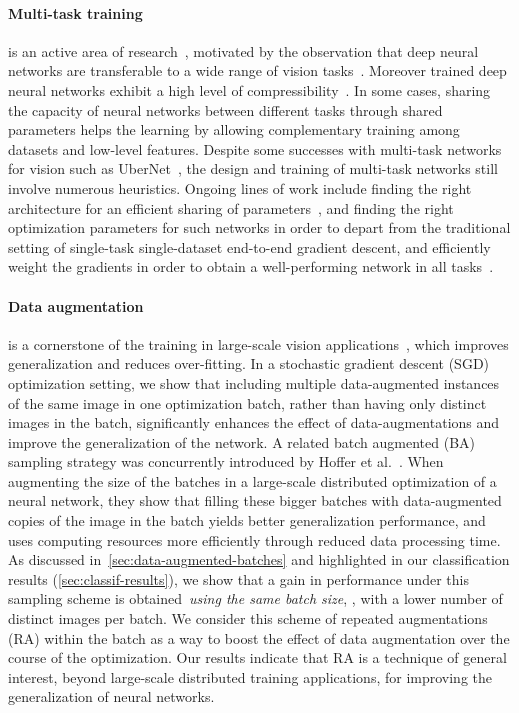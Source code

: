\paragraph{Multi-task training}\hspace{-1em}
is an active area of research~\cite{Kokkinos2017UberNetTA,Zamir2018TaskonomyDT}, motivated by the observation that deep neural networks are transferable to a wide range of vision tasks~\cite{Razavian2014CNNFO}. 
%
Moreover trained deep neural networks exhibit a high level of compressibility~\cite{han2015deep}. 
%
In some cases, sharing the capacity of neural networks between different tasks through shared parameters  
%
helps the learning by allowing complementary training among datasets and low-level features. 
Despite some successes with multi-task networks for vision such as UberNet~\cite{Kokkinos2017UberNetTA}, the design and training of multi-task networks still involve numerous heuristics. 
Ongoing lines of work include finding the right architecture for an efficient sharing of parameters~\cite{rebuffi2018efficient}, and finding the right optimization parameters for such networks in order to depart from the traditional setting of single-task single-dataset end-to-end gradient descent, and efficiently weight the gradients in order to obtain a well-performing network in all tasks~\cite{guo2018dynamic}. 

\paragraph{Data augmentation}\hspace{-1em} is a cornerstone of the training in large-scale vision applications~\cite{krizhevsky2012imagenet}, which improves generalization and reduces over-fitting. 
%
In a stochastic gradient descent (SGD) optimization setting, we show that including multiple data-augmented instances of the same image in one optimization batch, rather than having only distinct images in the batch, significantly enhances the effect of data-augmentations and improve the generalization of the network. 
A related batch augmented (BA) sampling strategy was concurrently introduced by Hoffer et al.~\cite{2019arXiv190109335H}. 
When augmenting the size of the batches in a large-scale distributed optimization of a neural network, they show that filling these bigger batches with data-augmented copies of the image in the batch yields better generalization performance, and uses computing resources more efficiently through reduced data processing time. 
As discussed in~\cref{sec:data-augmented-batches} and highlighted in our classification results (\cref{sec:classif-results}), we show that a gain in performance under this sampling scheme is obtained~\emph{using the same batch size}, \ie, with a lower number of distinct images per batch. 
We consider this scheme of repeated augmentations (RA) within the batch as a way to boost the effect of data augmentation over the course of the optimization. 
Our results indicate that RA is a technique of general interest, beyond large-scale distributed training applications, for improving the generalization of neural networks. 


%
%
%